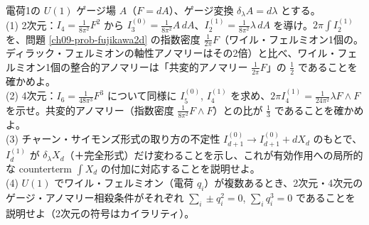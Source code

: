 \begin{problem}[難易度 C]\label{ch09-prob-descent}
電荷1の $U(1)$ ゲージ場 $A$（$F=dA$）、ゲージ変換 $\delta_\lambda A=d\lambda$ とする。\\
(1) 2次元：$I_4=\frac{1}{8\pi^2}F^2$ から $I_3^{(0)}=\frac1{8\pi^2}A\,dA$、$I_2^{(1)}=\frac1{8\pi^2}\lambda\,dA$ を導け。$2\pi\int I_2^{(1)}$ を、問題 \ref{ch09-prob-fujikawa2d} の指数密度 $\frac{1}{2\pi}F$（ワイル・フェルミオン1個の。ディラック・フェルミオンの軸性アノマリーはその2倍）と比べ、ワイル・フェルミオン1個の整合的アノマリーは「共変的アノマリー $\frac1{2\pi}F$」の $\frac12$ であることを確かめよ。\\
(2) 4次元：$I_6=\frac1{48\pi^3}F^3$ について同様に $I_5^{(0)}$, $I_4^{(1)}$ を求め、$2\pi I_4^{(1)}=\frac{1}{24\pi^2}\lambda F\wedge F$ を示せ。共変的アノマリー（指数密度 $\frac1{8\pi^2}F\wedge F$）との比が $\frac13$ であることを確かめよ。\\
(3) チャーン・サイモンズ形式の取り方の不定性 $I^{(0)}_{d+1}\to I^{(0)}_{d+1}+dX_d$ のもとで、$I^{(1)}_d$ が $\delta_\lambda X_d$（＋完全形式）だけ変わることを示し、これが有効作用への局所的な counterterm $\int X_d$ の付加に対応することを説明せよ。\\
(4) $U(1)$ でワイル・フェルミオン（電荷 $q_i$）が複数あるとき、2次元・4次元のゲージ・アノマリー相殺条件がそれぞれ $\sum_i\pm q_i^2=0$, $\sum_iq_i^3=0$ であることを説明せよ（2次元の符号はカイラリティ）。
\end{problem}

